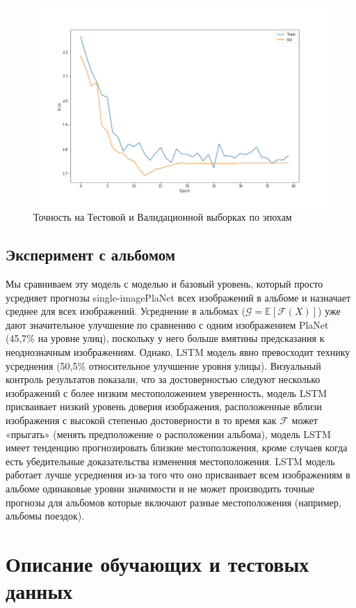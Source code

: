 \begin{figure}[h]
	\centering
	\includegraphics[width=0.8\linewidth]{img/train1im}
	\caption{Точность на Тестовой и Валидационной выборках по эпохам}
	\label{fig:train1im}
\end{figure}


\subsection{Эксперимент с альбомом} 

Мы сравниваем эту модель с моделью и базовый уровень, который просто усредняет прогнозы single-imagePlaNet всех изображений в альбоме и назначает
среднее для всех изображений. Усреднение в альбомах ($ \mathcal{G}= \mathbb{E}[ \mathcal{F}(X) ] $) уже
дают значительное улучшение по сравнению с одним изображением PlaNet
(45,7\% на уровне улиц), поскольку у него больше
вмятины предсказания к неоднозначным изображениям. Однако, LSTM
модель явно превосходит технику усреднения (50,5\%
относительное улучшение уровня улицы). Визуальный контроль
результатов показали, что за достоверностью следуют несколько изображений с более низким местоположением уверенность, модель LSTM присваивает низкий уровень доверия изображения, расположенные вблизи изображения с высокой степенью достоверности в то время как $ \mathcal{F} $ может «прыгать» (менять предположение о расположении альбома), модель LSTM имеет тенденцию прогнозировать близкие местоположения, кроме случаев когда есть убедительные доказательства изменения местоположения. LSTM модель работает лучше усреднения из-за того что оно присваивает всем изображениям в альбоме одинаковые уровни значимости и не может производить точные прогнозы для альбомов которые включают разные местоположения (например, альбомы поездок).

\section{Описание обучающих и тестовых данных}

